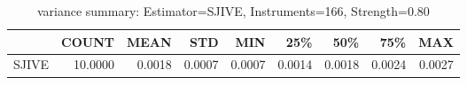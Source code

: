\begin{table}[ht]
\centering
\caption{variance summary: Estimator=SJIVE, Instruments=166, Strength=0.80}
\begin{tabular}{lrrrrrrrr}
\toprule
 & COUNT & MEAN & STD & MIN & 25\% & 50\% & 75\% & MAX \\
\midrule
SJIVE & 10.0000 & 0.0018 & 0.0007 & 0.0007 & 0.0014 & 0.0018 & 0.0024 & 0.0027 \\
\bottomrule
\end{tabular}
\end{table}
